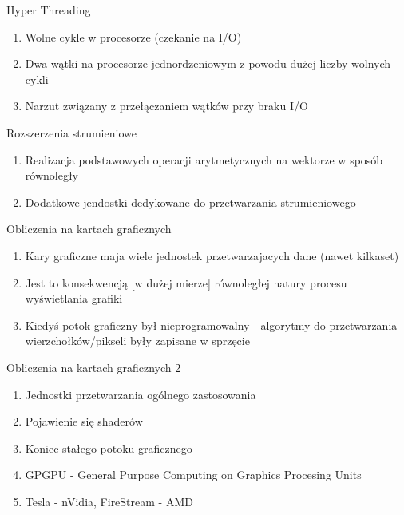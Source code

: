 \documentclass{beamer}
\begin{document}
\begin{frame}{Hyper Threading}
  \begin{enumerate}
  \item Wolne cykle w procesorze (czekanie na I/O)
  \item Dwa wątki na procesorze jednordzeniowym z powodu dużej liczby wolnych cykli
  \item Narzut związany z przełączaniem wątków przy braku I/O
  \end{enumerate}
\end{frame}

\begin{frame}{Rozszerzenia strumieniowe}
  \begin{enumerate}
  \item Realizacja podstawowych operacji arytmetycznych na wektorze w sposób równoległy
  \item Dodatkowe jendostki dedykowane do przetwarzania strumieniowego
  \end{enumerate}
\end{frame}

\begin{frame}{Obliczenia na kartach graficznych}
  \begin{enumerate}
  \item Kary graficzne maja wiele jednostek przetwarzajacych dane (nawet kilkaset)
  \item Jest to konsekwencją [w dużej mierze] równoległej natury procesu wyświetlania grafiki
  \item Kiedyś potok graficzny był nieprogramowalny - algorytmy do przetwarzania wierzchołków/pikseli były zapisane w sprzęcie
  \end{enumerate}
\end{frame}

\begin{frame}{Obliczenia na kartach graficznych 2}
  \begin{enumerate}
  \item Jednostki przetwarzania ogólnego zastosowania
  \item Pojawienie się shaderów
  \item Koniec stałego potoku graficznego
  \item GPGPU - General Purpose Computing on Graphics Procesing Units
  \item Tesla - nVidia, FireStream - AMD
  \end{enumerate}
\end{frame}
\end{document}
